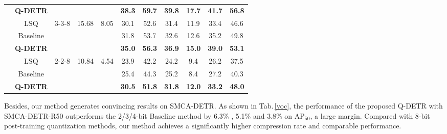 \documentclass[10pt,twocolumn,letterpaper]{article}
\begin{document}
\begin{table*}[!t]
\begin{tabular}{ccccccccccc}
& \textbf{Q-DETR} &                        &                        &                        & \textbf{38.3}                                              & \textbf{59.7} & \textbf{39.8} & \textbf{17.7} & \textbf{41.7} & \textbf{56.8} \\ \cline{2-11} 
& LSQ             & \multirow{3}{*}{3-3-8} & \multirow{3}{*}{15.68} & \multirow{3}{*}{8.05}  & 30.1                                                       & 52.6          & 31.4          & 11.9          & 33.4          & 46.6          \\
& Baseline        &                        &                        &                        & 31.8                                                       & 53.7          & 32.6          & 12.6          & 35.2          & 49.8          \\
& \textbf{Q-DETR} &                        &                        &                        & \textbf{35.0}                                              & \textbf{56.3}          & \textbf{36.9}          & \textbf{15.0} & \textbf{39.0} & \textbf{53.1} \\ \cline{2-11} 
& LSQ             & \multirow{3}{*}{2-2-8} & \multirow{3}{*}{10.84}  & \multirow{3}{*}{4.54}  & 23.9                                                       & 42.2          & 24.2          & 9.4           & 26.2          & 37.5          \\
& Baseline        &                        &                        &                        & 25.4                                                       & 44.3          & 25.2          & 8.4           & 27.2          & 40.3          \\
& \textbf{Q-DETR} &                        &                        &                        & \textbf{30.5}                                              & \textbf{51.8} & \textbf{31.8} & \textbf{12.0} & \textbf{33.2} & \textbf{48.0} \\ \hline
\end{tabular}
\label{COCO}
\end{table*}



Besides, our method generates convincing results on SMCA-DETR. As shown in Tab.\,\ref{voc}, the performance of the proposed Q-DETR with SMCA-DETR-R50 outperforms the 2/3/4-bit Baseline method by 6.3\% , 5.1\% and 3.8\% on AP$_{50}$, a large margin. Compared with 8-bit post-training quantization methods, our method achieves a significantly higher compression rate and comparable performance. 
\end{document}
